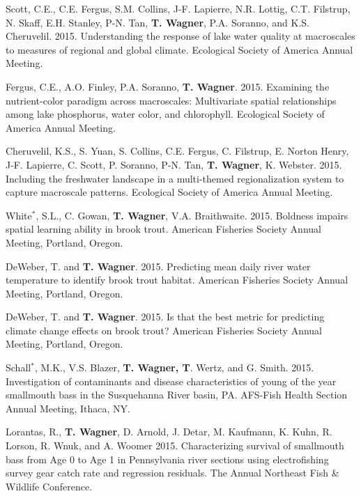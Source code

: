 \documentclass[10pt]{article}
\begin{document}
\begin{flushleft}
\begin{etaremune}
\item Scott, C.E., C.E. Fergus, S.M. Collins, J-F. Lapierre, N.R. Lottig, C.T. Filstrup, N. Skaff, E.H. Stanley, P-N. Tan, {\bf T. Wagner}, P.A. Soranno, and K.S. Cheruvelil. 2015. Understanding the response of lake water quality at macroscales to measures of regional and global climate. Ecological Society of America Annual Meeting.

\item Fergus, C.E., A.O. Finley, P.A. Soranno, {\bf T. Wagner}. 2015. Examining the nutrient-color paradigm across macroscales: Multivariate spatial relationships among lake phosphorus, water color, and chlorophyll.  Ecological Society of America Annual Meeting.\\

\item Cheruvelil, K.S., S. Yuan, S. Collins, C.E. Fergus, C. Filstrup, E. Norton Henry, J-F. Lapierre, C. Scott, P. Soranno, P-N. Tan, {\bf T. Wagner}, K. Webster. 2015. Including the freshwater landscape in a multi-themed regionalization system to capture macroscale patterns. Ecological Society of America Annual Meeting.

\item White$^*$, S.L., C. Gowan, {\bf T. Wagner}, V.A. Braithwaite. 2015. Boldness impairs spatial learning ability in brook trout. American Fisheries Society Annual Meeting, Portland, Oregon.

\item DeWeber, T. and {\bf T. Wagner}. 2015. Predicting mean daily river water temperature to identify brook trout habitat. American Fisheries Society Annual Meeting, Portland, Oregon.

\item DeWeber, T. and {\bf T. Wagner}. 2015. Is that the best metric for predicting climate change effects on brook trout? American Fisheries Society Annual Meeting, Portland, Oregon.

\item Schall$^*$, M.K., V.S. Blazer, {\bf T. Wagner, T}. Wertz, and G. Smith.  2015. Investigation of contaminants and disease characteristics of young of the year smallmouth bass in the Susquehanna River basin, PA. AFS-Fish Health Section Annual Meeting, Ithaca, NY. 

\item Lorantas, R., {\bf T. Wagner}, D. Arnold, J. Detar, M. Kaufmann, K. Kuhn, R. Lorson, R. Wnuk, and A. Woomer 2015. Characterizing survival of smallmouth bass from Age 0 to Age 1 in Pennsylvania river sections using electrofishing survey gear catch rate and regression residuals.  The Annual Northeast Fish \& Wildlife Conference. 


\end{etaremune}
\end{flushleft}
\end{document}

